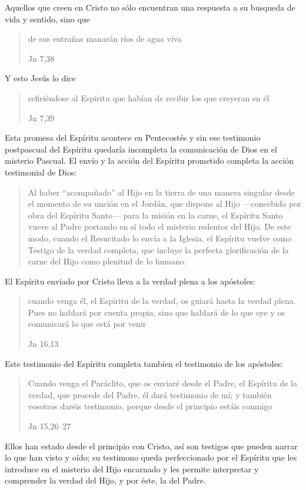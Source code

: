 Aquellos que creen en Cristo no sólo encuentran una respuesta a su busqueda de
vida y sentido, sino que \blockquote[Jn 7,38]{de sus entrañas manarán ríos de
  agua viva}. Y esto Jesús lo dice \blockquote[Jn 7,39]{refiriéndose al Espíritu
  que habían de recibir los que creyeran en él}. Esta promesa del Espíritu
acontece en Pentecostés y sin ese testimonio postpascual del Espíritu quedaría
incompleta la comunicación de Dios en el misterio
Pascual.\autocite[Cf.][135]{prades2015testimonio} El envío y la acción del
Espíritu prometido completa la acción testimonial de Dios:
\blockquote[{\cite[134s]{prades2015testimonio}}]{Al haber \enquote{acompañado}
  al Hijo en la tierra de una manera singular desde el momento de su unción en
  el Jordán, que dispone al Hijo ---concebido por obra del Espíritu Santo---
  para la misión en la carne, el Espíritu Santo vueve al Padre portando en sí
  todo el misterio redentor del Hijo. De este modo, cuando el Resucitado lo
  envía a la Iglesia, el Espíritu vuelve como Testigo de la verdad completa, que
  incluye la perfecta glorificación de la carne del Hijo como plenitud de lo
  humano.}

El Espíritu enviado por Cristo lleva a la verdad plena a los apóstoles:
\blockquote[Jn 16,13]{cuando venga él, el Espíritu de la verdad, os guiará hasta
  la verdad plena. Pues no hablará por cuenta propia, sino que hablará de lo que
  oye y os comunicará lo que está por venir}. Este testimonio del Espíritu
completa tambíen el testimonio de los apóstoles: \blockquote[Jn
15,26--27]{Cuando venga el Paráclito, que os enviaré desde el Padre, el Espíritu
  de la verdad, que procede del Padre, él dará testimonio de mí; y también
  vosotros daréis testimonio, porque desde el principio estáis conmigo}. Ellos
han estado desde el principio con Cristo, así son testigos que pueden narrar lo
que han visto y oído; su testimono queda perfeccionado por el Espíritu que les
introduce en el misterio del Hijo encarnado y les permite interpretar y
comprender la verdad del Hijo, y por éste, la del
Padre.\autocite[Cf.][139]{prades2015testimonio}

